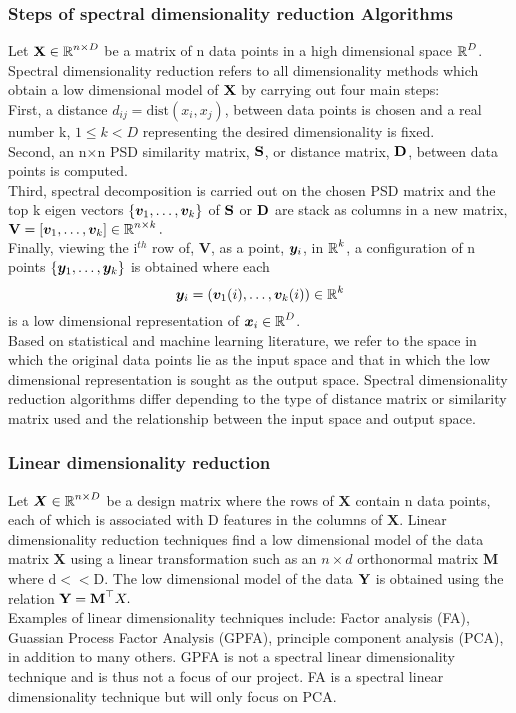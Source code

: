 \subsubsection{Steps of spectral dimensionality reduction Algorithms}
Let $\textbf{X} \in \operatorname{\mathbb{R}}^{n \times D}$ be a matrix of n data points in a high dimensional space $\operatorname{\mathbb{R}}^{D}$. Spectral dimensionality reduction refers to all 
dimensionality methods which obtain a low dimensional model of $\textbf{X}$
by carrying out four main steps:\\
First, a distance $d_{ij} = \text{dist}(x_{i}, x_{j})$, between data points
is chosen and a real number k, $1 \leq k < D$ representing the desired dimensionality is fixed.\\
Second, an n$\times$n PSD similarity matrix, $\textbf{S}$, or distance matrix, $\textbf{D}$, between data points is computed.\\
Third, spectral decomposition is carried out on the chosen PSD matrix and
the top k eigen vectors $\{ \boldsymbol{v}_{1}, \ldots, \boldsymbol{v}_{k} \}$ of $\textbf{S}$
or $\textbf{D}$ are stack as columns in a new matrix, 
$\textbf{V} = [\boldsymbol{v}_{1}, \ldots, \boldsymbol{v}_{k}] \in \operatorname{\mathbb{R}}^{n \times k}.$\\
Finally, viewing the i$^{th}$ row of, $\bm{V}$, as a point, $\boldsymbol{y}_{i}$,
in $\operatorname{\mathbb{R}}^{k}$, a configuration of n points 
$\{\boldsymbol{y}_{1}, \ldots, \boldsymbol{y}_{k} \}$ is obtained where each
\[  
\boldsymbol{y}_{i} = (\boldsymbol{v}_{1}(i), \ldots, \boldsymbol{v}_{k}(i)) \in \operatorname{\mathbb{R}}^{k}
\]
is a low dimensional representation of $\boldsymbol{x}_{i} \in \operatorname{\mathbb{R}}^{D}$.\\


Based on statistical and machine learning literature, we refer to the space 
in which the original data points lie as the input space and that in which
the low dimensional representation is sought as the output space. 
Spectral dimensionality reduction algorithms differ depending to the
type of distance matrix or similarity matrix used and the relationship
between the input space and output space.

\subsubsection{Linear dimensionality  reduction}
Let $\bm{X} \in \operatorname{\mathbb{R}}^{n \times D}$ be a design matrix where the rows of
$\bm{X}$ contain n data points, each of which is associated with D features
in the columns of $\bm{X}$.
Linear dimensionality reduction techniques find a low dimensional model of the data matrix $\textbf{X}$ using a linear transformation such as an $n \times d$ orthonormal matrix \textbf{M} where d$<<$D. The low dimensional model of the data
$\textbf{Y}$ is obtained using the relation $\textbf{Y} = \textbf{M}^{\top}X.$\\
Examples of linear dimensionality techniques include: Factor analysis (FA), Guassian Process Factor Analysis (GPFA), principle component analysis (PCA), in addition to many others. GPFA is not a spectral linear dimensionality technique and is thus not a focus of our project. FA is a spectral linear dimensionality technique but will only focus on PCA.\\ 




